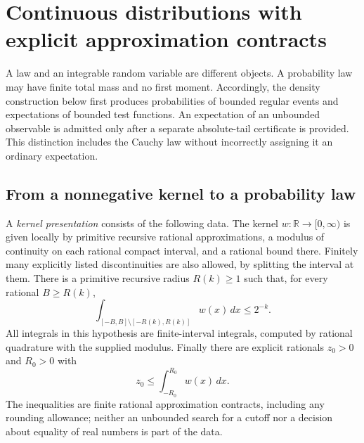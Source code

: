 
\section{Continuous distributions with explicit approximation contracts}
\label{sec:continuous-laws}

A law and an integrable random variable are different objects.  A probability
law may have finite total mass and no first moment.  Accordingly, the density
construction below first produces probabilities of bounded regular events and
expectations of bounded test functions.  An expectation of an unbounded
observable is admitted only after a separate absolute-tail certificate is
provided.  This distinction includes the Cauchy law without incorrectly
assigning it an ordinary expectation.

\subsection{From a nonnegative kernel to a probability law}

A \emph{kernel presentation} consists of the following data.  The kernel
$w\colon\mathbb R\to[0,\infty)$ is given locally by primitive recursive rational
approximations, a modulus of continuity on each rational compact interval, and
a rational bound there.  Finitely many explicitly listed discontinuities are
also allowed, by splitting the interval at them.  There is a primitive
recursive radius $R(k)\geq 1$ such that, for every rational $B\geq R(k)$,
\begin{equation}
 \int_{[-B,B]\setminus[-R(k),R(k)]}w(x)\,dx\leq 2^{-k}.
 \tag{K1}\label{eq:kernel-tail}
\end{equation}
All integrals in this hypothesis are finite-interval integrals, computed by
rational quadrature with the supplied modulus.  Finally there are explicit
rationals $z_0>0$ and $R_0>0$ with
\begin{equation}
 z_0\leq\int_{-R_0}^{R_0}w(x)\,dx.
 \tag{K2}\label{eq:kernel-positive}
\end{equation}
The inequalities are finite rational approximation contracts, including any
rounding allowance; neither an unbounded search for a cutoff nor a decision
about equality of real numbers is part of the data.

